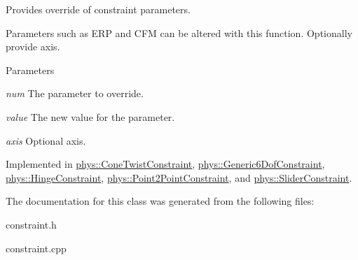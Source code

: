 Provides override of constraint parameters. 

Parameters such as ERP and CFM can be altered with this function. Optionally provide axis. 
\begin{DoxyParams}{Parameters}
\item[{\em num}]The parameter to override. \item[{\em value}]The new value for the parameter. \item[{\em axis}]Optional axis. \end{DoxyParams}


Implemented in \hyperlink{classphys_1_1ConeTwistConstraint_a555fc33b10a0c156e0ac93b94587098a}{phys::ConeTwistConstraint}, \hyperlink{classphys_1_1Generic6DofConstraint_a644245f0533a2fe1586609fcf1f48171}{phys::Generic6DofConstraint}, \hyperlink{classphys_1_1HingeConstraint_adec79d062d67532e3521eaae6b49f877}{phys::HingeConstraint}, \hyperlink{classphys_1_1Point2PointConstraint_ad6f28464773121658e54e8bde2a14704}{phys::Point2PointConstraint}, and \hyperlink{classphys_1_1SliderConstraint_a1516aeff86674a969411b17a1847d115}{phys::SliderConstraint}.



The documentation for this class was generated from the following files:\begin{DoxyCompactItemize}
\item 
constraint.h\item 
constraint.cpp\end{DoxyCompactItemize}

